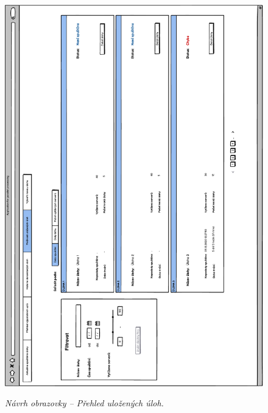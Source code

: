 \begin{figure}[H]
\begin{center}
    \scalebox{0.78}
    {   
        \includegraphics{images/wireframe_appendix_savedTaskOverview.pdf}
    }
    \caption{\label{obr:wireframe_appendix_savedTaskOverview} {\it Návrh obrazovky -- Přehled uložených úloh.}}
\end{center}
\end{figure}


